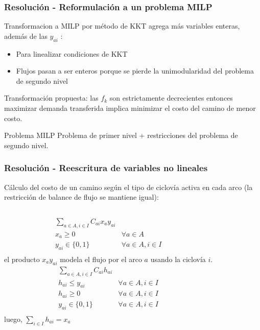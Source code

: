 \documentclass[aspectratio=43, 10pt]{beamer}
\begin{document}
\begin{frame}
    \frametitle{Resolución - Reformulación a un problema MILP}

    Transformacion a MILP por método de KKT agrega más variables enteras, además de las $y_{ai}$ \parencite{kara2004}:
    \begin{itemize}
    \item{Para linealizar condiciones de KKT}
    \item{Flujos pasan a ser enteros porque se pierde la unimodularidad del problema de segundo nivel}
    \end{itemize}

    \vspace{10pt}

    Transformación propuesta: las $f_k$ son estrictamente decrecientes entonces maximizar demanda transferida implica minimizar el costo del camino de menor costo.
    \vspace{10pt}

    \begin{block}{Problema MILP}
        Problema de primer nivel + restricciones del problema de segundo nivel.
    \end{block}
\end{frame}

\begin{frame}
    \frametitle{Resolución - Reescritura de variables no lineales}
    Cálculo del costo de un camino según el tipo de ciclovía activa en cada arco (la restricción de balance de flujo se mantiene igual):

    \begin{columns}[c]
            \begin{eqnarray*}
              \sum_{a \in A, i \in I} C_{ai} x_a y_{ai} \\
              x_a \geq 0 & \forall a \in A \\
              y_{ai} \in \{0,1\} & \forall a \in A, i \in I \\
            \end{eqnarray*}
            el producto $x_a y_{ai}$ modela el flujo por el arco $a$ usando la
            ciclovía $i$.
            \begin{eqnarray*}
              \sum_{a \in A, i \in I} C_{ai} h_{ai} & \\
              h_{ai} \leq y_{ai} & \forall a \in A, i \in I \\
              h_{ai} \geq 0 & \forall a \in A, i \in I \\
              y_{ai} \in \{0,1\} & \forall a \in A, i \in I \\
            \end{eqnarray*}
            luego, $\sum_{i \in I} h_{ai} = x_{a}$
    \end{columns}
\end{frame}
\end{document}
